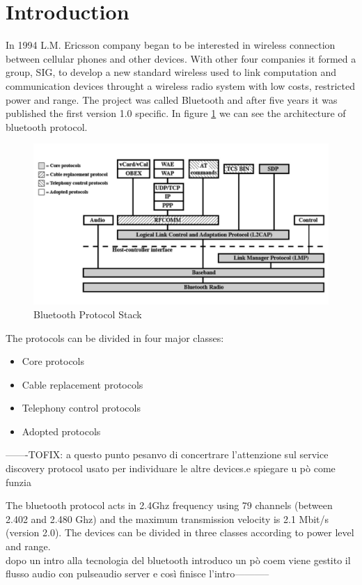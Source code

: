 \documentclass[conference]{./IEEEtran}
\begin{document}
\section{Introduction}
In 1994 L.M. Ericsson company began to be interested in wireless connection between cellular phones and other devices. With other four companies it formed a group, SIG, to develop a new standard wireless used to link computation and communication devices throught a wireless radio system with low costs, restricted power and range. The project was called Bluetooth and after five years it was published the first version 1.0 specific.
In figure \ref{stack} we can see the architecture of bluetooth protocol.
\begin{figure}[h]
\centering
\includegraphics[scale = 0.22]{stackBT.png}
\caption{Bluetooth Protocol Stack}
\label{stack}
\end{figure}

The protocols can be divided in four major classes:
\begin{itemize}
\item Core protocols
\item Cable replacement protocols
\item Telephony control protocols
\item Adopted protocols
\end{itemize}

-------TOFIX: a questo punto pesanvo di concertrare l'attenzione sul service discovery protocol usato per individuare le altre devices.e spiegare u pò come funzia


The bluetooth protocol acts in 2.4Ghz frequency using 79 channels (between 2.402 and 2.480 Ghz) and the maximum transmission velocity is 2.1 Mbit/s (version 2.0). The devices can be divided in three classes according to power level and range.\\
dopo un intro alla tecnologia del bluetooth introduco un pò coem viene gestito il flusso audio con pulseaudio server e così finisce l'intro-----------
\end{document}
